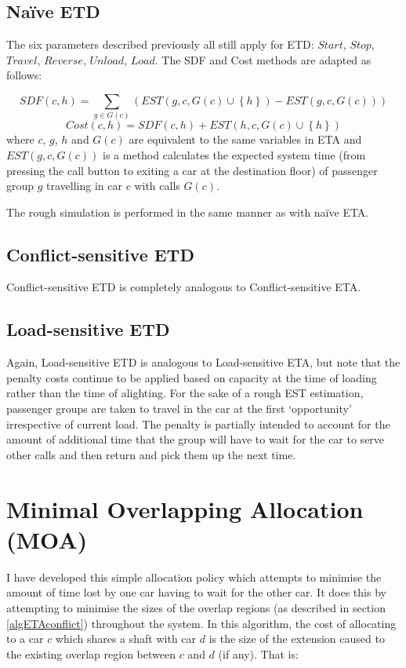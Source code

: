 \documentclass{UoYCSproject}
\begin{document}
\subsection{Na\"{i}ve ETD}

The six parameters described previously all still apply for ETD: $Start$, $Stop$, $Travel$, $Reverse$, $Unload$, $Load$.  The SDF and Cost methods are adapted as follows:

\[ SDF(c, h) = \sum\limits_{g \in G(c)} (EST(g, c, G(c) \cup \left\{ h \right\}) - EST(g, c, G(c)))\]
\[ Cost(c, h) = SDF(c, h) + EST(h, c, G(c) \cup \left\{ h \right\}) \]
where $c$, $g$, $h$ and $G(c)$ are equivalent to the same variables in ETA and $EST(g,c,G(c))$ is a method calculates the expected system time (from pressing the call button to exiting a car at the destination floor) of passenger group $g$ travelling in car $c$ with calls $G(c)$.

The rough simulation is performed in the same manner as with na\"{i}ve ETA.

\subsection{Conflict-sensitive ETD}

Conflict-sensitive ETD is completely analogous to Conflict-sensitive ETA.

\subsection{Load-sensitive ETD}

Again, Load-sensitive ETD is analogous to Load-sensitive ETA, but note that the penalty costs continue to be applied based on capacity at the time of loading rather than the time of alighting.  For the sake of a rough EST estimation, passenger groups are taken to travel in the car at the first `opportunity' irrespective of current load.  The penalty is partially intended to account for the amount of additional time that the group will have to wait for the car to serve other calls and then return and pick them up the next time.

\section{Minimal Overlapping Allocation (MOA)}

I have developed this simple allocation policy which attempts to minimise the amount of time lost by one car having to wait for the other car.  It does this by attempting to minimise the sizes of the overlap regions (as described in section \ref{algETAconflict}) throughout the system.  In this algorithm, the cost of allocating to a car $c$ which shares a shaft with car $d$ is the size of the extension caused to the existing overlap region between $c$ and $d$ (if any).  That is:
\end{document}

